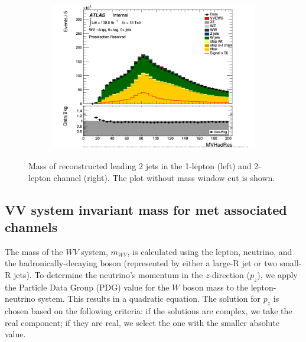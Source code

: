 \begin{figure}[ht]
    \centering
    \begin{subfigure}{0.3\textwidth}
        \includegraphics[width=\linewidth]{figures/1lep/CRPlots/C_0ptag0pjet_0ptv_Presel_Resolved_MVHadRes_Lin.png}
        \caption{\emph{\olep}}
    \end{subfigure}
    \begin{subfigure}{0.3\textwidth}
        \caption{\emph{\tlep}}
    \end{subfigure}
    \caption{Mass of reconstructed leading 2 jets in the 1-lepton (left) and 2-lepton channel (right). The plot without mass window cut is shown.}
    \label{fig:1lep2lepMVHadResSR}
\end{figure}



\subsection{VV system invariant mass for met associated channels}
\label{subsubsec:mVV_reconstruction}

The mass of the $WV$ system, $m_{WV}$, is calculated using the lepton, neutrino, and the hadronically-decaying boson (represented by either a large-R jet or two small-R jets). To determine the neutrino's momentum in the $z$-direction ($p_z$), we apply the Particle Data Group (PDG) value for the $W$ boson mass to the lepton-neutrino system. This results in a quadratic equation. The solution for $p_z$ is chosen based on the following criteria: if the solutions are complex, we take the real component; if they are real, we select the one with the smaller absolute value.


